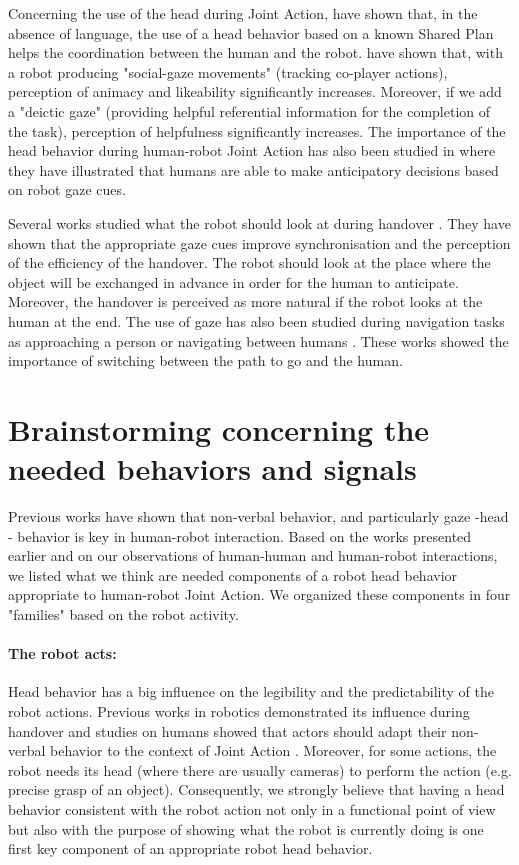 \documentclass[english,a4paper,11pt,twoside]{StyleThese}
\begin{document}
Concerning the use of the head during Joint Action, \cite{lallee2013cooperative} have shown that, in the absence of language, the use of a head behavior based on a known Shared Plan helps the coordination between the human and the robot. \cite{zaga2017simple} have shown that, with a robot producing "social-gaze movements" (tracking co-player actions), perception of animacy and likeability significantly increases. Moreover, if we add a "deictic gaze" (providing helpful referential information for the completion of the task), perception of helpfulness significantly increases. The importance of the head behavior during human-robot Joint Action has also been studied in \cite{boucher2012reach} where they have illustrated that humans are able to make anticipatory decisions based on robot gaze cues. 

Several works studied what the robot should look at during handover \cite{moon2014meet, gharbi2015toward}. They have shown that the appropriate gaze cues improve synchronisation and the perception of the efficiency of the handover. The robot should look at the place where the object will be exchanged in advance in order for the human to anticipate. Moreover, the handover is perceived as more natural if the robot looks at the human at the end. The use of gaze has also been studied during navigation tasks as approaching a person \cite{fischer2016between} or navigating between humans \cite{khambhaita_hfr_2016}. These works showed the importance of switching between the path to go and the human.


\section{Brainstorming concerning the needed behaviors and signals}

\label{sec:reflection}

Previous works have shown that non-verbal behavior, and particularly gaze -head - behavior is key in human-robot interaction. Based on the works presented earlier and on our observations of human-human and human-robot interactions, we listed what we think are needed components of a robot head behavior appropriate to human-robot Joint Action. We organized these components in four "families" based on the robot activity.

\paragraph{The robot acts:}
Head behavior has a big influence on the legibility and the predictability of the robot actions. Previous works in robotics demonstrated its influence during handover \cite{moon2014meet, gharbi2015toward} and studies on humans showed that actors should adapt their non-verbal behavior to the context of Joint Action \cite{becchio2010toward, vesper2010minimal}. Moreover, for some actions, the robot needs its head (where there are usually cameras) to perform the action (e.g. precise grasp of an object). Consequently, we strongly believe that having a head behavior consistent with the robot action not only in a functional point of view but also with the purpose of showing what the robot is currently doing is one first key component of an appropriate robot head behavior.
\end{document}
